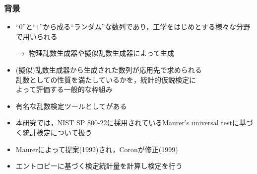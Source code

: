 \documentclass[dvipdfmx,11pt]{beamer}
\begin{document}
\begin{frame}[t]\frametitle{背景}
\vspace{.2\baselineskip}
\begin{itemize}\setlength{\itemsep}{0.2\baselineskip}
  \item ``$0$''と``$1$''から成る``ランダム''な数列であり，工学をはじめとする様々な分野で用いられる
  \item[$\to$] 物理乱数生成器や擬似乱数生成器によって生成
\end{itemize}
%
\vspace{.5\baselineskip}
\vspace{.2\baselineskip}
\begin{itemize}\setlength{\itemsep}{0.2\baselineskip}
  \item (擬似)乱数生成器から生成された数列が応用先で求められる\\乱数としての性質を満たしているかを，統計的仮説検定に\\よって評価する一般的な枠組み
  \item 有名な乱数検定ツールとしてがある
  \item 本研究では，NIST SP 800-22に採用されている\alert{Maurer's universal test}に基づく統計検定について扱う
\end{itemize}
%
\vspace{.5\baselineskip}
\vspace{.2\baselineskip}
\begin{itemize}\setlength{\itemsep}{0.2\baselineskip}
  \item Maurerによって提案(1992)され，Coronが修正(1999)
  \item エントロピーに基づく検定統計量を計算し検定を行う
\end{itemize}
%
\end{frame}
\end{document}

